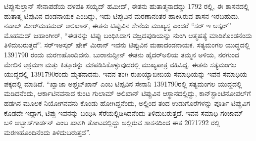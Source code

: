 ಟಿಪ್ಪುಸುಲ್ತಾನ್​ ಸೇನಾಪಡೆಯ ದಳಪತಿ ಸಯ್ಯದ್​ ಹಮೀದ್​, ಈತನು ಹುತಾತ್ಮನಾದದ್ದು 1792 ರಲ್ಲಿ, ಈ ಶಾಸನದಲ್ಲಿ ಹುತಾತ್ಮ ಟಿಪುವಿನ ದಂಡನಾಯಕ ಎಂದಿದ್ದು, ಇದು ಟಿಪ್ಪುವಿನ ಮರಣಾನಂತರ ಹಾಕಿಸಿರುವ ಶಾಸನ ಇರಬಹುದು. ನವಾಬ್​ ಮೀರ್​ಮಹಮದ್​ ಅಲಿಖಾನ್​, ಈತನು ಟಿಪ್ಪುವಿನ ಸೇನೆಯ ಮುಖ್ಯಸ್ಥ ಎಂದರೆ “ಸರ್​ ಇ ಅಸ್ಕರ್​” ಮೊಹಮದ್​ ಜಹಾಂಗೀರ್​, “ಈತನನ್ನು ಟಿಪ್ಪು ಬಂಧಿಸಿದಾಗ ವಜ್ರದಪುಡಿಯನ್ನು ನುಂಗಿ ಆತ್ಮಹತ್ಯೆ ಮಾಡಿಕೊಂಡನೆಂದು ತಿಳಿದು\-ಬರುತ್ತದೆ”. ಸರ್​ಇಅಸ್ಕರ್​ ಷೇಕ್​ ಮಿರಾನ್​ ಇವನು ಟಿಪ್ಪುವಿನ ಮಹಾದಂಡನಾಯಕ. ಸತ್ಯಮಂಗಲ ಯುದ್ಧದಲ್ಲಿ 1391790 ರಂದು ಮರಣಹೊಂದಿದನು. ಬುರಾನುದ್ದೀನ್​ ಈತನು ಹೈದರ್​ಅಲಿಯ ತಮ್ಮನ ಅಳಿಯ, ನರಗುಂದ ಮೇಲಿನ ಆಕ್ರಮಣ ಮತ್ತು ಕಿತ್ತೂರನ್ನು ವಶಪಡಿಸಿಕೊಳ್ಳುವುದರಲ್ಲಿ ಮುಖ್ಯಪಾತ್ರ ವಹಿಸಿದ್ದ. ಈತನು ಸತ್ಯಮಂಗಲ ಯುದ್ಧದಲ್ಲಿ 1391790ರಂದು ಮೃತನಾದನು. ಇವನ ತಂಗಿ ರುಖಯ್ಯಾಬೀಬಿಯ ಸಮಾಧಿಯನ್ನು ಇವನ ಸಮಾಧಿಯ ಪಕ್ಕದಲ್ಲಿ ಮಾಡಿದೆ. “ಖ್ವಾಜಾ ಅಫ್ತಬ್​ಖಾನ್​ ಎಂಬ ಟಿಪ್ಪವಿನ ಸೇನಾನಿ 1391790ರಲ್ಲಿ ಸತ್ಯಮಂಗಲ ಯುದ್ಧದಲ್ಲಿ ಮಡಿದನೆಂದು, ಆರ್ಕಾಟಿನವನಾದ ಕುಂಟ ಗುಲಾಮ್ ಅಲಿಖಾನ್​ ಟಿಪ್ಪುವಿನ ಆಸ್ಥಾನದಲ್ಲಿದ್ದು, ಕಾನ್​ಸ್ಟಾಂಟಿನೋಪಲ್​ಗೆ ಹಡಗಿನ ಮೂಲಕ ನಿಯೋಗನವನು ಕೊಂಡು ಹೋಗಿದ್ದನೆಂದು, ಅಲ್ಲಿಂದ ತಂದ ಉಡುಗೊರೆಗಳನ್ನು ಪೂರ್ತಿ ಟಿಪ್ಪುವಿಗ ಕೊಡದೇ ಇದ್ದಾಗ, ಟಿಪ್ಪು ಇವನನ್ನು ಬಂಧಿಸಿ ಸೆರೆಯಲ್ಲಿಡಿಸಿದನೆಂದು ತಿಳಿದುಬರುತ್ತದೆ. ಇವನ ಸಮಾಧಿ ಗಂಜಾಮ್ ಬಳಿ ಅಬ್ಬಾಸ್​ಗಾರ್ಡನ್​ ಎಂಬ ಖಾಸಗಿ ತೋಟದಲ್ಲಿದ್ದು ಅಲ್ಲಿರುವ ಶಾಸನದಿಂದ ಈತ 2071792 ರಲ್ಲಿ ಮರಣಹೊಂದಿನೆಂದು ತಿಳಿದುಬರುತ್ತದೆ”.

